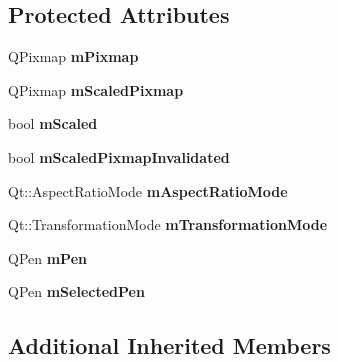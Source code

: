 \subsection*{Protected Attributes}
\begin{DoxyCompactItemize}
\item 
Q\+Pixmap {\bfseries m\+Pixmap}\hypertarget{classQCPItemPixmap_a1396cce7f26c7b8e9512906284380c4d}{}\label{classQCPItemPixmap_a1396cce7f26c7b8e9512906284380c4d}

\item 
Q\+Pixmap {\bfseries m\+Scaled\+Pixmap}\hypertarget{classQCPItemPixmap_a2ebc66e15b9f1264563d58f29ba1bc00}{}\label{classQCPItemPixmap_a2ebc66e15b9f1264563d58f29ba1bc00}

\item 
bool {\bfseries m\+Scaled}\hypertarget{classQCPItemPixmap_a8fe670a529cd46a9b8afd9fc1203bc3f}{}\label{classQCPItemPixmap_a8fe670a529cd46a9b8afd9fc1203bc3f}

\item 
bool {\bfseries m\+Scaled\+Pixmap\+Invalidated}\hypertarget{classQCPItemPixmap_a223134abd4cf3d6c368573c622bd2e1c}{}\label{classQCPItemPixmap_a223134abd4cf3d6c368573c622bd2e1c}

\item 
Qt\+::\+Aspect\+Ratio\+Mode {\bfseries m\+Aspect\+Ratio\+Mode}\hypertarget{classQCPItemPixmap_a8dc6b6c1e106ac523efae22d5fe55bab}{}\label{classQCPItemPixmap_a8dc6b6c1e106ac523efae22d5fe55bab}

\item 
Qt\+::\+Transformation\+Mode {\bfseries m\+Transformation\+Mode}\hypertarget{classQCPItemPixmap_ac9ecad3b9842363754e32eda2cf821bd}{}\label{classQCPItemPixmap_ac9ecad3b9842363754e32eda2cf821bd}

\item 
Q\+Pen {\bfseries m\+Pen}\hypertarget{classQCPItemPixmap_acfee1124eb51a1887aaf8de10777c7a1}{}\label{classQCPItemPixmap_acfee1124eb51a1887aaf8de10777c7a1}

\item 
Q\+Pen {\bfseries m\+Selected\+Pen}\hypertarget{classQCPItemPixmap_a0949e5bb6a261fc4e9668e28e2effcfa}{}\label{classQCPItemPixmap_a0949e5bb6a261fc4e9668e28e2effcfa}

\end{DoxyCompactItemize}
\subsection*{Additional Inherited Members}


